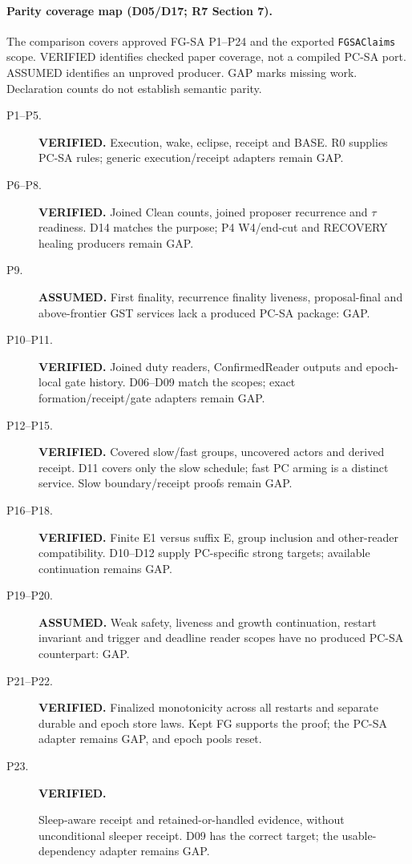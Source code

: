 \documentclass{article}
\newcommand{\nm}[1]{\nolinkurl{#1}}
\begin{document}
\paragraph{Parity coverage map (D05/D17; R7 Section 7).}
The comparison covers approved FG-SA P1--P24 and the exported
\nm{FGSAClaims} scope. VERIFIED identifies checked paper coverage, not a
compiled PC-SA port. ASSUMED identifies an unproved producer. GAP marks
missing work. Declaration counts do not establish semantic parity.
\begin{description}
\item[P1--P5.] \textbf{VERIFIED.} Execution, wake, eclipse, receipt and BASE.
R0 supplies PC-SA rules; generic execution/receipt adapters remain GAP.
\item[P6--P8.] \textbf{VERIFIED.} Joined Clean counts, joined proposer recurrence
and $\tau$ readiness. D14 matches the purpose; P4 W4/end-cut and RECOVERY
healing producers remain GAP.
\item[P9.] \textbf{ASSUMED.} First finality, recurrence finality liveness,
proposal-final and above-frontier GST services lack a produced PC-SA
package: GAP.
\item[P10--P11.] \textbf{VERIFIED.} Joined duty readers, ConfirmedReader outputs
and epoch-local gate history. D06--D09 match the scopes; exact
formation/receipt/gate adapters remain GAP.
\item[P12--P15.] \textbf{VERIFIED.} Covered slow/fast groups, uncovered actors
and derived receipt. D11 covers only the slow schedule; fast PC arming is
a distinct service. Slow boundary/receipt proofs remain GAP.
\item[P16--P18.] \textbf{VERIFIED.} Finite E1 versus suffix E, group inclusion and
other-reader compatibility. D10--D12 supply PC-specific strong targets;
available continuation remains GAP.
\item[P19--P20.] \textbf{ASSUMED.} Weak safety, liveness and growth continuation,
restart invariant and trigger and deadline reader scopes have no produced
PC-SA counterpart: GAP.
\item[P21--P22.] \textbf{VERIFIED.} Finalized monotonicity across all restarts and
separate durable and epoch store laws. Kept FG supports the proof; the PC-SA
adapter remains GAP, and epoch pools reset.
\item[P23.] \textbf{VERIFIED.}\par Sleep-aware receipt and retained-or-handled
evidence, without unconditional sleeper receipt. D09 has the correct
target; the usable-dependency adapter remains GAP.

\end{description}
\end{document}
